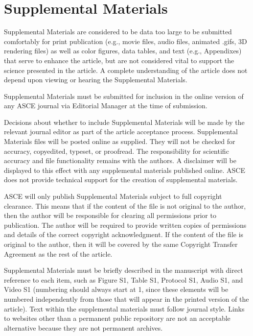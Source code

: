 \documentclass[NewProceedings, InsideFigs,LineNumbers]{asce-quarto}
\begin{document}
\section{Supplemental Materials}\label{supplemental-materials}

Supplemental Materials are considered to be data too large to be
submitted comfortably for print publication (e.g., movie files, audio
files, animated .gifs, 3D rendering files) as well as color figures,
data tables, and text (e.g., Appendixes) that serve to enhance the
article, but are not considered vital to support the science presented
in the article. A complete understanding of the article does not depend
upon viewing or hearing the Supplemental Materials.

Supplemental Materials must be submitted for inclusion in the online
version of any ASCE journal via Editorial Manager at the time of
submission.

Decisions about whether to include Supplemental Materials will be made
by the relevant journal editor as part of the article acceptance
process. Supplemental Materials files will be posted online as supplied.
They will not be checked for accuracy, copyedited, typeset, or
proofread. The responsibility for scientific accuracy and file
functionality remains with the authors. A disclaimer will be displayed
to this effect with any supplemental materials published online. ASCE
does not provide technical support for the creation of supplemental
materials.

ASCE will only publish Supplemental Materials subject to full copyright
clearance. This means that if the content of the file is not original to
the author, then the author will be responsible for clearing all
permissions prior to publication. The author will be required to provide
written copies of permissions and details of the correct copyright
acknowledgment. If the content of the file is original to the author,
then it will be covered by the same Copyright Transfer Agreement as the
rest of the article.

Supplemental Materials must be briefly described in the manuscript with
direct reference to each item, such as Figure S1, Table S1, Protocol S1,
Audio S1, and Video S1 (numbering should always start at 1, since these
elements will be numbered independently from those that will appear in
the printed version of the article). Text within the supplemental
materials must follow journal style. Links to websites other than a
permanent public repository are not an acceptable alternative because
they are not permanent archives.
\end{document}
